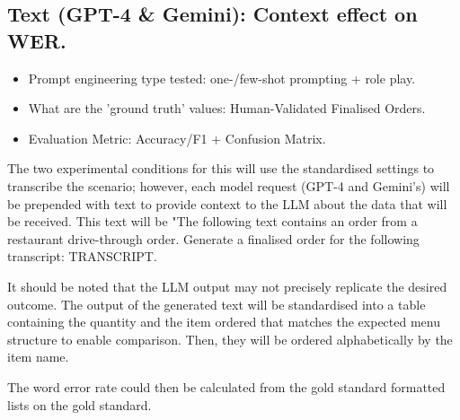 
\subsection{Text (GPT-4 \& Gemini): Context effect on WER.}

\begin{itemize}
    \item Prompt engineering type tested: one-/few-shot prompting + role play.
    \item What are the 'ground truth' values: Human-Validated Finalised Orders.
    \item Evaluation Metric: Accuracy/F1 + Confusion Matrix.
\end{itemize}

The two experimental conditions for this will use the standardised settings to transcribe the scenario; however, each model request (GPT-4 and Gemini's) will be prepended with text to provide context to the LLM about the data that will be received. This text will be "The following text contains an order from a restaurant drive-through order. Generate a finalised order for the following transcript: TRANSCRIPT.  

It should be noted that the LLM output may not precisely replicate the desired outcome. The output of the generated text will be standardised into a table containing the quantity and the item ordered that matches the expected menu structure to enable comparison. Then, they will be ordered alphabetically by the item name. 

The word error rate could then be calculated from the gold standard formatted lists on the gold standard. 
